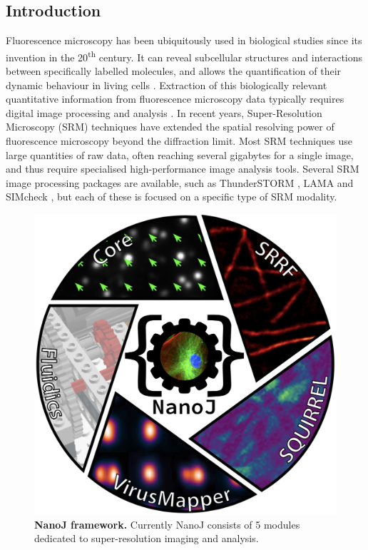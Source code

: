 \subsection*{Introduction}
Fluorescence microscopy has been ubiquitously used in biological studies since its invention in the 20\textsuperscript{th} century. It can reveal subcellular structures and interactions between specifically labelled molecules, and allows the quantification of their dynamic behaviour in living cells \cite{rino2009frontiers}. Extraction of this biologically relevant quantitative information from fluorescence microscopy data typically requires digital image processing and analysis \cite{wheeler2017standard}. In recent years, Super-Resolution Microscopy (SRM) techniques \cite{betzig2006imaging,rust2006sub,hell1994breaking} have extended the spatial resolving power of fluorescence microscopy beyond the diffraction limit. Most SRM techniques use large quantities of raw data, often reaching several gigabytes for a single image, and thus require specialised high-performance image analysis tools.  Several SRM image processing packages are available, such as ThunderSTORM \cite{ovesny2014thunderstorm}, LAMA \cite{Malkusch2016LAMA} and SIMcheck \cite{schermelleh2015simcheck}, but each of these is focused on a specific type of SRM modality.
  
 \begin{figure}[!t]
    \centering
    \includegraphics[width=0.6\linewidth]{Figures/FigureMain_v3.png}
    \caption{\textbf{NanoJ framework.} Currently NanoJ consists of 5 modules dedicated to super-resolution imaging and analysis.}
    \label{fig:GeneralDiagram}
 \end{figure}
 

